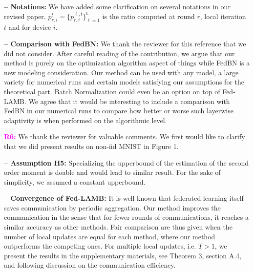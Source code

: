 \documentclass{article}
\begin{document}
\textbf{-- Notations:} We have added some clarification on several notations in our revised paper. 
$p_{r,i}^{t} = \{p_{r,i}^{\ell,t}\}_{\ell=1}^{\mathsf{L}}$ is the ratio computed at round $r$, local iteration $t$ and for device $i$.

\vspace{-0.5pt}
\textbf{-- Comparison with FedBN:} We thank the reviewer for this reference that we did not consider.
After careful reading of the contribution, we argue that our method is purely on the optimization algorithm aspect of things while FedBN is a new modeling consideration.
Our method can be used with any model, a large variety for numerical runs and certain models satisfying our assumptions for the theoretical part. 
Batch Normalization could even be an option on top of Fed-LAMB.
We agree that it would be interesting to include a comparison with FedBN in our numerical runs to compare how better or worse such layerwise adaptivity is when performed on the algorithmic level.

 \vspace{1pt}
\textbf{\textcolor{magenta}{R6:}} We thank the reviewer for valuable comments. We first would like to clarify that we did present results on non-iid MNIST in Figure 1.
\vspace{-1pt}

\textbf{-- Assumption H5:} Specializing the upperbound of the estimation of the second order moment is doable and would lead to similar result. For the sake of simplicity, we assumed a constant upperbound.

\vspace{-0.5pt}
\textbf{-- Convergence of Fed-LAMB:} It is well known that federated learning itself saves communication by periodic aggregation. Our method improves the communication in the sense that for fewer rounds of communications, it reaches a similar accuracy as other methods.
Fair comparison are thus given when the number of local updates are equal for each method, where our method outperforms the competing ones. For multiple local updates, i.e. $T > 1$, we present the results in the supplementary materials, see Theorem 3, section A.4, and following discussion on the communication efficiency.

\end{document}

